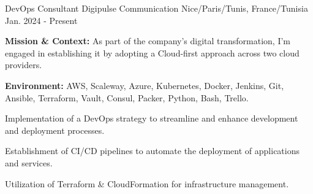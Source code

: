 
\begin{cventries}

\cventry
{DevOps Consultant} %
{Digipulse Communication} %
{Nice/Paris/Tunis, France/Tunisia} %
{Jan. 2024 - Present} %
{
  \begin{cvitems} %
    \item {\textbf{Mission \& Context:} As part of the company's digital transformation, I'm engaged in establishing it by adopting a Cloud-first approach across two cloud providers.}
    \item {\textbf{Environment:} AWS, Scaleway, Azure, Kubernetes, Docker, Jenkins, Git, Ansible, Terraform, Vault, Consul, Packer, Python, Bash, Trello.}
    \item {Implementation of a DevOps strategy to streamline and enhance development and deployment processes.}
    \item {Establishment of CI/CD pipelines to automate the deployment of applications and services.}
    \item {Utilization of Terraform \& CloudFormation for infrastructure management.}
  \end{cvitems}
}


\end{cventries}
